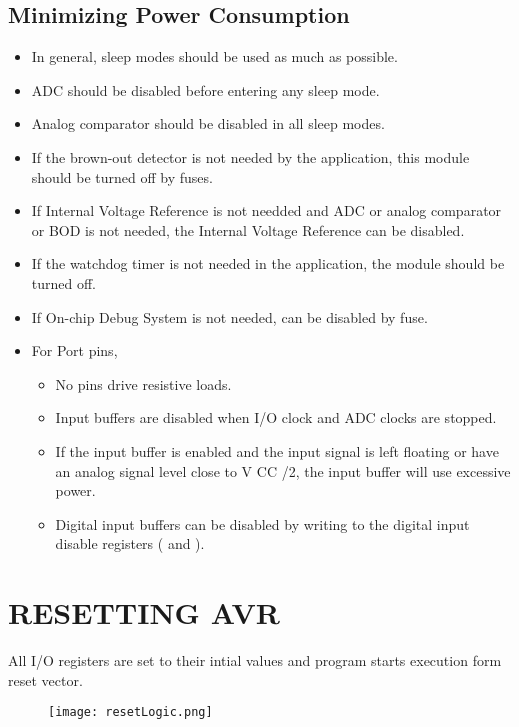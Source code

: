 \documentclass{article}
\begin{document}
\subsection{Minimizing Power Consumption}
\begin{itemize}
    \item In general, sleep modes should be used as much as possible.
    \item ADC should be disabled before entering any sleep mode.
    \item Analog comparator should be disabled in  all sleep modes.
    \item If the brown-out detector is not needed by the application, this module should be turned off by  fuses.
    \item If Internal Voltage Reference is not needded and ADC or analog comparator or BOD is not needed, the Internal Voltage Reference can be disabled.
    \item If the watchdog timer is not needed in the application, the module should be turned off.
    \item If On-chip Debug System is not needed, can be disabled by  fuse.
    \item For Port pins,
          \begin{itemize}
              \item No pins drive resistive loads.
              \item Input buffers are disabled when I/O clock and ADC clocks are stopped.
              \item If the input buffer is enabled and the input signal is left floating or have an analog signal level close to V CC /2, the input buffer will use excessive power.
              \item Digital input buffers can be disabled by writing to the digital input disable registers ( and ).
          \end{itemize}
\end{itemize}

\section{RESETTING AVR}
\quad All I/O registers are set to their intial values and program starts execution form reset vector.

\begin{figure}[H]
    \begin{center}
        \texttt{[image: resetLogic.png]}
    \end{center}
\end{figure}
\end{document}
